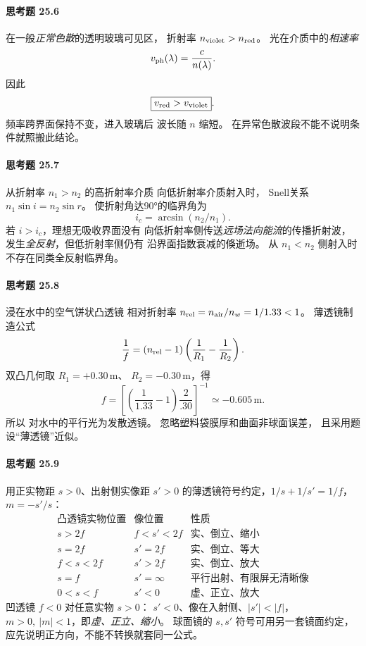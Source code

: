 \paragraph{思考题 25.6}
在一般\emph{正常色散}的透明玻璃可见区，
折射率 \(n_{\rm violet}>n_{\rm red}\)。
光在介质中的\emph{相速率}
\[
v_{\rm ph}(\lambda)=\frac c{n(\lambda)}.
\]
因此
\[
\boxed{v_{\rm red}>v_{\rm violet}}.
\]
频率跨界面保持不变，进入玻璃后
波长随 \(n\) 缩短。
在异常色散波段不能不说明条件就照搬此结论。

\paragraph{思考题 25.7}
从折射率 \(n_1>n_2\) 的高折射率介质
向低折射率介质射入时，
Snell关系
\(n_1\sin i=n_2\sin r\)。
使折射角达90°的临界角为
\[
\boxed{i_c=\arcsin(n_2/n_1)}.
\]
若 \(i>i_c\)，理想无吸收界面没有
向低折射率侧传送\emph{远场法向能流}的传播折射波，
发生\emph{全反射}，但低折射率侧仍有
沿界面指数衰减的倏逝场。
从 \(n_1<n_2\) 侧射入时不存在同类全反射临界角。

\paragraph{思考题 25.8}
浸在水中的空气饼状凸透镜
相对折射率
\(n_{\rm rel}=n_{\rm air}/n_w=1/1.33<1\)。
薄透镜制造公式
\[
\frac1f=(n_{\rm rel}-1)
\left(\frac1{R_1}-\frac1{R_2}\right).
\]
双凸几何取 \(R_1=+0.30\,\mathrm m\)、
\(R_2=-0.30\,\mathrm m\)，得
\[
\boxed{f=\left[
\left(\frac1{1.33}-1\right)\frac2{.30}
\right]^{-1}\simeq-0.605\,\mathrm m}.
\]
所以
\(\boxed{\text{对水中的平行光为发散透镜}}\)。
忽略塑料袋膜厚和曲面非球面误差，
且采用题设“薄透镜”近似。

\paragraph{思考题 25.9}
用正实物距 \(s>0\)、出射侧实像距 \(s'>0\)
的薄透镜符号约定，\(1/s+1/s'=1/f\)，
\(m=-s'/s\)：
\[
\begin{array}{c|c|c}
\text{凸透镜实物位置}&\text{像位置}&\text{性质}\\\hline
s>2f&f<s'<2f&\text{实、倒立、缩小}\\
s=2f&s'=2f&\text{实、倒立、等大}\\
f<s<2f&s'>2f&\text{实、倒立、放大}\\
s=f&s'=\infty&\text{平行出射、有限屏无清晰像}\\
0<s<f&s'<0&\text{虚、正立、放大}
\end{array}
\]
凹透镜 \(f<0\) 对任意实物 \(s>0\)：
\(s'<0\)、像在入射侧、\(|s'|<|f|\)，
\(\boxed{m>0,\ |m|<1}\)，即\emph{虚、正立、缩小}。
球面镜的 \(s,s'\) 符号可用另一套镜面约定，
应先说明正方向，不能不转换就套同一公式。

